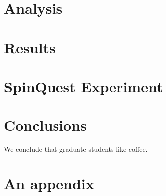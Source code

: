 \documentclass{uiucthesis2021}
\begin{document}
\chapter{Analysis}


\chapter{Results}


\chapter{SpinQuest Experiment}


% 
% 
% 
% 

\chapter{Conclusions}

We conclude that graduate students like coffee.


\backmatter

\printbibliography[heading=bibintoc,title={References}]

\mainmatter  %

\appendix

\chapter{An appendix}

\lipsum[1-5]

% 
\end{document}

